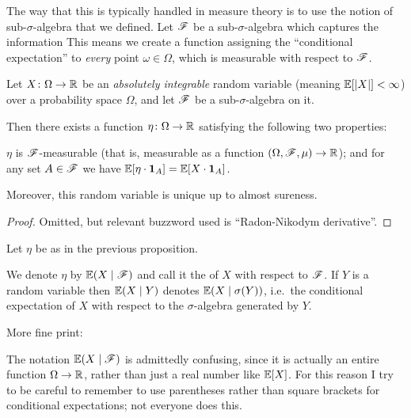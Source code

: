 The way that this is typically handled in measure theory
is to use the notion of sub-$\sigma$-algebra that we defined.
Let $\mathscr F$ be a sub-$\sigma$-algebra which captures the information
This means we create a function assigning the
``conditional expectation'' to \emph{every} point $\omega \in \Omega$,
which is measurable with respect to $\mathscr F$.

\begin{proposition}
	\label{prop:conditional_exp}
	Let $X \colon \Omega \to \mathbb R$ be an \emph{absolutely integrable}
	random variable (meaning $\mathbb E[|X|] < \infty$)
	over a probability space $\Omega$,
	and let $\mathscr F$ be a sub-$\sigma$-algebra on it.

	Then there exists a function $\eta \colon \Omega \to \mathbb R$
	satisfying the following two properties:
	\begin{itemize}
		\ii $\eta$ is $\mathscr F$-measurable (that is,
			measurable as a function $(\Omega, \mathscr F, \mu) \to \mathbb R$); and
		\ii for any set $A \in \mathscr F$ we have
		$\mathbb E[\eta \cdot \mathbf{1}_A] = \mathbb E[X \cdot \mathbf{1}_A]$.
	\end{itemize}
	Moreover, this random variable is unique up to almost sureness.
\end{proposition}
\begin{proof}
	Omitted, but relevant buzzword used is ``Radon-Nikodym derivative''.
\end{proof}

\begin{definition}
	Let $\eta$ be as in the previous proposition.
	\begin{itemize}
		\ii We denote $\eta$ by $\mathbb E(X \mid \mathscr F)$
		and call it the  of $X$ with respect to $\mathscr F$.
		\ii If $Y$ is a random variable then
		$\mathbb E(X \mid Y)$ denotes $\mathbb E(X \mid \sigma(Y))$,
		i.e.\ the conditional expectation of $X$
		with respect to the $\sigma$-algebra generated by $Y$.
	\end{itemize}
\end{definition}

More fine print:
\begin{remark}
	The notation $\mathbb E(X \mid \mathscr F)$ is admittedly confusing,
	since it is actually an entire function $\Omega \to \mathbb R$,
	rather than just a real number like $\mathbb E[X]$.
	For this reason I try to be careful to remember
	to use parentheses rather than square brackets
	for conditional expectations; not everyone does this.
\end{remark}

